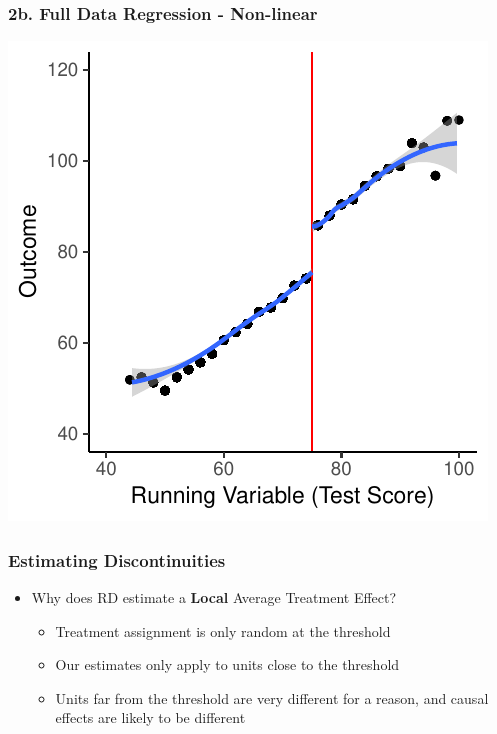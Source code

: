 \documentclass[xcolor=x11names,compress]{beamer}\usepackage[]{graphicx}\usepackage[]{color}
\makeatletter
\def\maxwidth{ %
  \ifdim\Gin@nat@width>\linewidth
    \linewidth
  \else
    \Gin@nat@width
  \fi
}
\newenvironment{knitrout}{}{} %
\renewcommand{\(}{\begin{columns}}
\renewcommand{\)}{\end{columns}}
\newcommand{\<}[1]{\begin{column}{#1}}
\renewcommand{\>}{\end{column}}
\makeatother
\begin{document}
\begin{frame}
\frametitle{2b. Full Data Regression - Non-linear}
\begin{center}
\begin{knitrout}
\color{fgcolor}
\includegraphics[width=\maxwidth]{figure/chart5-1} 

\end{knitrout}
\end{center}
\end{frame}


\begin{frame}
\frametitle{Estimating Discontinuities}
\begin{itemize}
\item Why does RD estimate a \textbf{Local} Average Treatment Effect?
\pause
\begin{itemize}
\item Treatment assignment is only random at the threshold
\pause
\item Our estimates only apply to units close to the threshold
\pause
\item Units far from the threshold are very different for a reason, and causal effects are likely to be different
\end{itemize}
\end{itemize}
\end{frame}
\end{document}
